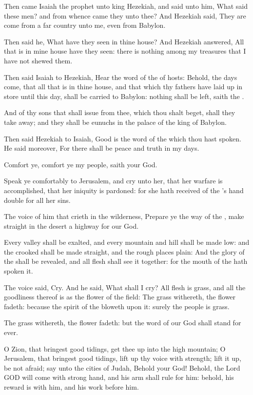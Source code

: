 \Verse Then came Isaiah the prophet unto king Hezekiah, and said unto him, What said these men? and from whence came they unto thee? And Hezekiah said, They are come from a far country unto me, even from Babylon.

\Verse Then said he, What have they seen in thine house? And Hezekiah answered, All that is in mine house have they seen: there is nothing among my treasures that I have not shewed them.

\Verse Then said Isaiah to Hezekiah, Hear the word of the \LORD of hosts: \Verse Behold, the days come, that all that is in thine house, and that which thy fathers have laid up in store until this day, shall be carried to Babylon: nothing shall be left, saith the \LORD.

\Verse And of thy sons that shall issue from thee, which thou shalt beget, shall they take away; and they shall be eunuchs in the palace of the king of Babylon.

\Verse Then said Hezekiah to Isaiah, Good is the word of the \LORD which thou hast spoken. He said moreover, For there shall be peace and truth in my days.


\Chapter
\Verse Comfort ye, comfort ye my people, saith your God.

\Verse Speak ye comfortably to Jerusalem, and cry unto her, that her warfare is accomplished, that her iniquity is pardoned: for she hath received of the \LORD's hand double for all her sins.

\Verse The voice of him that crieth in the wilderness, Prepare ye the way of the \LORD, make straight in the desert a highway for our God.

\Verse Every valley shall be exalted, and every mountain and hill shall be made low: and the crooked shall be made straight, and the rough places plain: \Verse And the glory of the \LORD shall be revealed, and all flesh shall see it together: for the mouth of the \LORD hath spoken it.

\Verse The voice said, Cry. And he said, What shall I cry? All flesh is grass, and all the goodliness thereof is as the flower of the field: \Verse The grass withereth, the flower fadeth: because the spirit of the \LORD bloweth upon it: surely the people is grass.

\Verse The grass withereth, the flower fadeth: but the word of our God shall stand for ever.

\Verse O Zion, that bringest good tidings, get thee up into the high mountain; O Jerusalem, that bringest good tidings, lift up thy voice with strength; lift it up, be not afraid; say unto the cities of Judah, Behold your God!  \Verse Behold, the Lord GOD will come with strong hand, and his arm shall rule for him: behold, his reward is with him, and his work before him.

